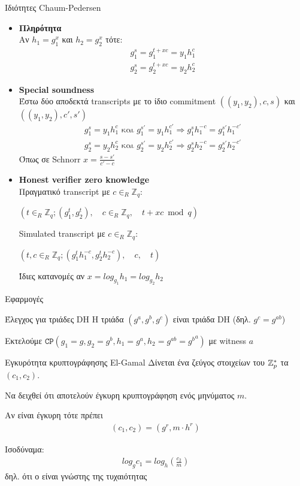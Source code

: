 \documentclass[handout]{beamer}
\begin{document}
\begin{frame}[allowframebreaks]{Ιδιότητες Chaum-Pedersen}
\begin{itemize}
\item \textbf{Πληρότητα}\\
Αν $h_1 = g_1^x$ και $h_2 = g_2^x$ τότε:
\begin{align*}
g_1^s = g_1^{t+xc} = y_1h_1^c \\
g_2^s = g_2^{t+xc} = y_2h_2^c
\end{align*}
\item \textbf{Special soundness}\\
Έστω δύο αποδεκτά transcripts με το ίδιο commitment $((y_1,y_2),c,s)$ και $((y_1,y_2),c',s')$
\begin{align*}
g_1^s =  y_1h_1^c \text{  και  } g_1^{s'} =  y_1h_1^{c'} \Rightarrow g_1^s h_1^{-c} = g_1^{s'} h_1^{-c'} \\
g_2^s =  y_2h_2^c \text{  και  } g_2^{s'} =  y_2h_2^{c'} \Rightarrow g_2^s h_2^{-c} = g_2^{s'} h_2^{-c'}
\end{align*}
Όπως σε Schnorr $x = \frac{s-s'}{c'-c}$
\framebreak
\item \textbf{Honest verifier zero knowledge}\\
Πραγματικό transcript με $c \in_R \mathbb{Z}_q$: 
\begin{center}
$(t \in_R \mathbb{Z}_q;(g_1^t,g_2^t), \quad c \in_R \mathbb{Z}_q,\quad t+xc \bmod{q})$
\end{center}
Simulated transcript με $c \in_R \mathbb{Z}_q$: 
\begin{center}
$(t,c \in_R \mathbb{Z}_q;(g_1^t h_1^{-c},g_2^th_2^{-c}), \quad c, \quad t)$
\end{center}
Ίδιες κατανομές αν $x=log_{g_1}{h_1}=log_{g_2}{h_2}$
\end{itemize}
\end{frame}

\begin{frame}{Εφαρμογές}
\begin{small}
\begin{block}{Έλεγχος για τριάδες DH}
Η τριάδα $(g^a,g^b,g^c)$ είναι τριάδα DH (δηλ. $g^c = g^{ab}$) 
\end{block}
\pause
Εκτελούμε $\mathtt{CP}(g_1 = g,g_2 = g^b,h_1 = g^a, h_2 = g^{ab} = {g^b}^a)$ με witness $a$
\begin{block}{Εγκυρότητα κρυπτογράφησης El-Gamal}
Δίνεται ένα ζεύγος στοιχείων του $\mathbb{Z}^*_{p}$ τα $(c_1,c_2)$. 

Να δειχθεί ότι αποτελούν έγκυρη κρυπτογράφηση ενός μηνύματος $m$.
\end{block}
\pause
Αν είναι έγκυρη τότε πρέπει
\begin{align*}
(c_1,c_2) = (g^r, m \cdot h^r)
\end{align*}

Ισοδύναμα: 
\begin{align*}
log_g c_1 = log_h (\frac{c_2}{m}) 
\end{align*}
δηλ. ότι ο \prv είναι γνώστης της τυχαιότητας
\end{small} 
\end{frame}
\end{document}
